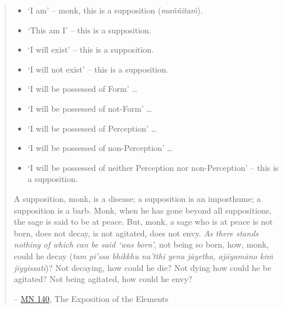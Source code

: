 \begin{quote}
\begin{itemize}
\item
  `I am' -- monk, this is a supposition (\textit{maññitaṁ}).
\item
  `This am I' -- this is a supposition.
\item
  `I will exist' -- this is a supposition.
\item
  `I will not exist' -- this is a supposition.
\item
  `I will be possessed of Form' \ldots\hspace{0pt}
\item
  `I will be possessed of not-Form' \ldots\hspace{0pt}
\item
  `I will be possessed of Perception' \ldots\hspace{0pt}
\item
  `I will be possessed of non-Perception' \ldots\hspace{0pt}
\item
  `I will be possessed of neither Perception nor non-Perception' -- this is a supposition.
\end{itemize}

A supposition, monk, is a disease; a supposition is an imposthume; a supposition is a barb. Monk, when he has gone beyond all suppositions, the sage is said to be at peace. But, monk, a sage who is at peace is not born, does not decay, is not agitated, does not envy. \emph{As there stands nothing of which can be said `was born'}, not being so born, how, monk, could he decay (\textit{tam pi'ssa bhikkhu na'tthi yena jāyetha, ajāyamāno kiṁ jiyyissati})? Not decaying, how could he die? Not dying how could he be agitated? Not being agitated, how could he envy?

 -- \href{https://suttacentral.net/mn140/en/bodhi}{MN 140}, The Exposition of the Elements
\end{quote}

